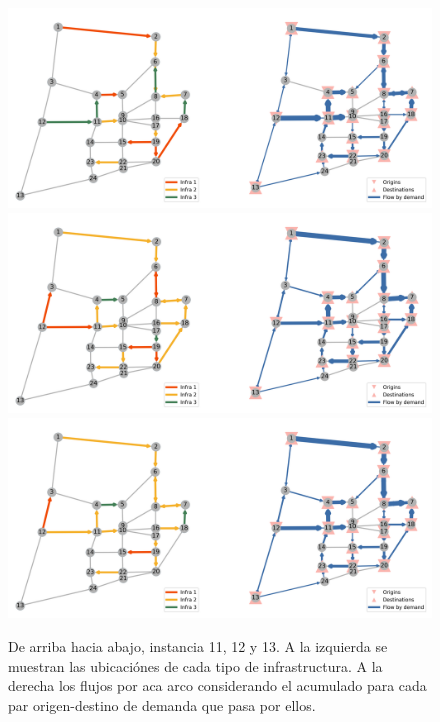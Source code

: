 \documentclass{article}
\begin{document}
  \begin{figure}[h!]
    \centering
    \includegraphics[width=12cm]{../resources/sioux_falls_0.4_budget_factor_linear_5_breakpoints.png}
    \includegraphics[width=12cm]{../resources/sioux_falls_0.4_budget_factor_linear_20_breakpoints.png}
    \includegraphics[width=12cm]{../resources/sioux_falls_0.4_budget_factor_linear_50_breakpoints.png}
      \caption{De arriba hacia abajo, instancia 11, 12 y 13. A la izquierda se muestran las ubicaciónes de cada tipo de infrastructura. A la derecha los flujos por aca arco considerando el acumulado para cada par origen-destino de demanda que pasa por ellos.}
    \label{fig:sensibilityinstance11_12_13}
  \end{figure}

\end{document}
